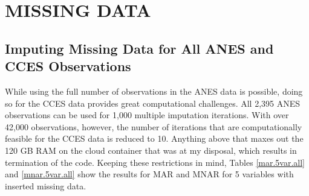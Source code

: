 \documentclass[12pt,econ]{sources/authesis}
\begin{document}
\normalsize

\hypertarget{app-ordmiss}{%
\chapter{MISSING DATA}\label{app-ordmiss}}

\hypertarget{app-ordmiss-allObs}{%
\section{Imputing Missing Data for All ANES and CCES Observations}\label{app-ordmiss-allObs}}

While using the full number of observations in the ANES data is possible, doing so for the CCES data provides great computational challenges. All 2,395 ANES observations can be used for 1,000 multiple imputation iterations. With over 42,000 observations, however, the number of iterations that are computationally feasible for the CCES data is reduced to 10. Anything above that maxes out the 120 GB RAM on the cloud container that was at my disposal, which results in termination of the code. Keeping these restrictions in mind, Tables \ref{mar.5var.all} and \ref{mnar.5var.all} show the results for MAR and MNAR for 5 variables with inserted missing data.
\end{document}
